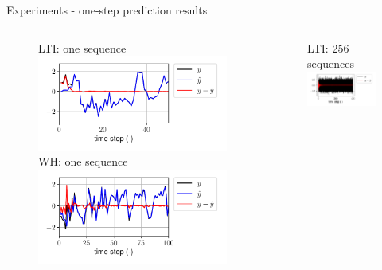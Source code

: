 \documentclass{beamer}
\begin{document}
\begin{frame}{Experiments - one-step prediction results}
\begin{columns}[t]
\begin{center}
\begin{figure}
LTI: one sequence
\includegraphics[width=\textwidth]{fig/lin_one_step_single.pdf}
WH: one sequence
\includegraphics[width=\textwidth]{fig/wh_one_step_single.pdf}
\end{figure}
\end{center}
\begin{center}
\begin{figure}
LTI: 256 sequences
\includegraphics[width=\textwidth]{fig/lin_one_step_batch.pdf}

\end{figure}
\end{center}
\end{columns}
\end{frame}
\end{document}
